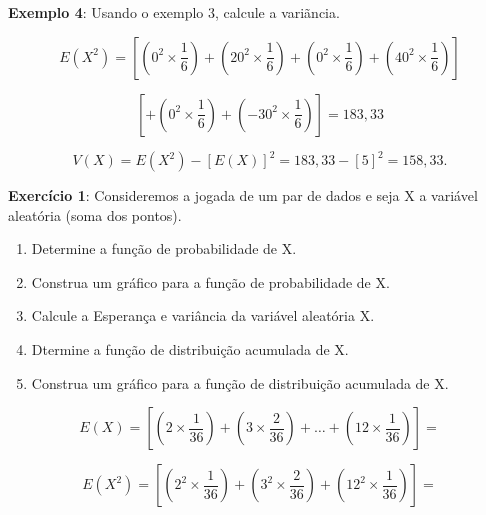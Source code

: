 \textbf{Exemplo 4}: Usando o exemplo 3, calcule a variãncia.


$$
E(X^{2})= \left[\left(0^{2} \times \frac{1}{6}\right)+\left(20^{2}
\times \frac{1}{6}\right)+ \left(0^{2} \times \frac{1}{6}\right)+
\left(40^{2} \times \frac{1}{6}\right)\right]
$$


$$
\left[+\left(0^{2} \times \frac{1}{6}\right)+\left(-30^{2} \times
\frac{1}{6}\right)\right]= 183,33
$$


$$
V(X) = E(X^{2})-[E(X)]^{2} = 183,33 - [5]^{2}= 158,33.
$$


\textbf{Exercício 1}: Consideremos a jogada de um par de dados e
seja X a variável aleatória (soma dos pontos).

\begin{enumerate}
    \item Determine a função de probabilidade de X.
    \item Construa um gráfico para a função de probabilidade de X.
    \item Calcule a Esperança e variância da variável aleatória X.
    \item Dtermine a função de distribuição acumulada de X.
    \item Construa um gráfico para a função de distribuição acumulada de X.
\end{enumerate}



\begin{table}[!htb] 
\end{table}

$$
E(X)= \left[\left(2 \times \frac{1}{36}\right)+\left(3 \times
\frac{2}{36}\right)+ \ldots +\left( 12 \times
\frac{1}{36}\right)\right]=
$$


$$
E(X^{2})= \left[\left(2^{2} \times \frac{1}{36}\right)+\left(3^{2}
\times \frac{2}{36}\right)+\left(12^{2} \times
\frac{1}{36}\right)\right]=
$$

